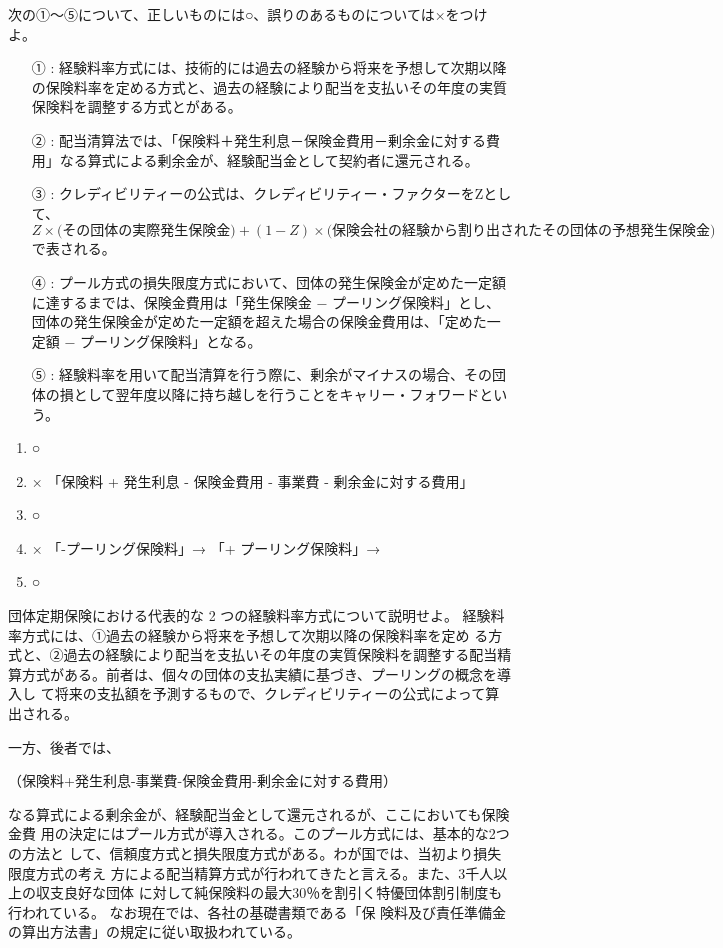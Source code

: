 \documentclass[report,gutter=10mm,fore-edge=10mm,uplatex,dvipdfmx]{jlreq}
\begin{document}
次の①～⑤について、正しいものには○、誤りのあるものについては×をつけよ。

\begin{itemize}
\item[ ① : ] 経験料率方式には、技術的には過去の経験から将来を予想して次期以降の保険料率を定める方式と、過去の経験により配当を支払いその年度の実質保険料を調整する方式とがある。
\item[ ② : ] 配当清算法では、「保険料＋発生利息－保険金費用－剰余金に対する費用」なる算式による剰余金が、経験配当金として契約者に還元される。
\item[ ③ : ] クレディビリティーの公式は、クレディビリティー・ファクターをZとして、
$$Z \times \text{(その団体の実際発生保険金)} +(1 - Z) \times \text{(保険会社の経験から割り出されたその団体の予想発生保険金)}
$$
で表される。
\item[ ④ : ] プール方式の損失限度方式において、団体の発生保険金が定めた一定額に達するまでは、保険金費用は「発生保険金 − プーリング保険料」とし、団体の発生保険金が定めた一定額を超えた場合の保険金費用は、「定めた一定額 − プーリング保険料」となる。
\item[ ⑤ : ] 経験料率を用いて配当清算を行う際に、剰余がマイナスの場合、その団体の損として翌年度以降に持ち越しを行うことをキャリー・フォワードという。
\end{itemize}

\answer{}
\begin{enumerate}
 \item ○
 \item ×  「保険料 + 発生利息 - 保険金費用 - 事業費 - 剰余金に対する費用」
 \item ○ 
 \item × 「-プーリング保険料」→ 「+ プーリング保険料」→
\item ○
\end{enumerate}
団体定期保険における代表的な 2 つの経験料率方式について説明せよ。
\answer{}
経験料率方式には、①過去の経験から将来を予想して次期以降の保険料率を定め
る方式と、②過去の経験により配当を支払いその年度の実質保険料を調整する配当精
算方式がある。前者は、個々の団体の支払実績に基づき、プーリングの概念を導入し
て将来の支払額を予測するもので、クレディビリティーの公式によって算出される。

一方、後者では、

（保険料+発生利息-事業費-保険金費用-剰余金に対する費用）

なる算式による剰余金が、経験配当金として還元されるが、ここにおいても保険金費
用の決定にはプール方式が導入される。このプール方式には、基本的な2つの方法と
して、信頼度方式と損失限度方式がある。わが国では、当初より損失限度方式の考え
方による配当精算方式が行われてきたと言える。また、3千人以上の収支良好な団体
に対して純保険料の最大30％を割引く特優団体割引制度も行われている。
なお現在では、各社の基礎書類である「保
険料及び責任準備金の算出方法書」の規定に従い取扱われている。
\end{document}
